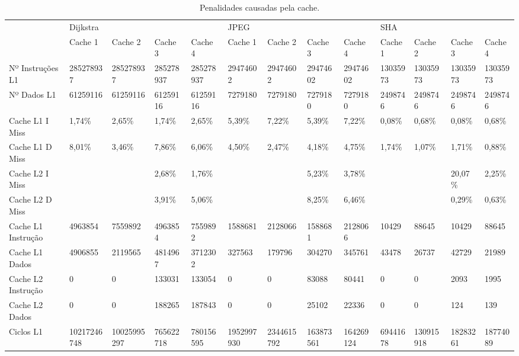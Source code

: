 \documentclass[pdftex,12pt,a4paper]{article}
\begin{document}
\begin{table}[h]
\resizebox{17cm}{!} {
\begin{tabular}{l|llll|llll|llll|}
                   & Dijkstra    &             &            &            & JPEG       &            &           &           & SHA       &           &           &           \\
                   & Cache 1     & Cache 2     & Cache 3    & Cache 4    & Cache 1    & Cache 2    & Cache 3   & Cache 4   & Cache 1   & Cache 2   & Cache 3   & Cache 4   \\ \hline
Nº Instruções L1   & 285278937   & 285278937   & 285278937  & 285278937  & 29474602   & 29474602   & 29474602  & 29474602  & 13035973  & 13035973  & 13035973  & 13035973  \\
Nº Dados L1        & 61259116    & 61259116    & 61259116   & 61259116   & 7279180    & 7279180    & 7279180   & 7279180   & 2498746   & 2498746   & 2498746   & 2498746   \\ \hline
Cache L1 I Miss    & 1,74\%      & 2,65\%      & 1,74\%     & 2,65\%     & 5,39\%     & 7,22\%     & 5,39\%    & 7,22\%    & 0,08\%    & 0,68\%    & 0,08\%    & 0,68\%    \\
Cache L1 D Miss    & 8,01\%      & 3,46\%      & 7,86\%     & 6,06\%     & 4,50\%     & 2,47\%     & 4,18\%    & 4,75\%    & 1,74\%    & 1,07\%    & 1,71\%    & 0,88\%    \\
Cache L2 I Miss    &             &             & 2,68\%     & 1,76\%     &            &            & 5,23\%    & 3,78\%    &           &           & 20,07\%   & 2,25\%    \\
Cache L2 D Miss    &             &             & 3,91\%     & 5,06\%     &            &            & 8,25\%    & 6,46\%    &           &           & 0,29\%    & 0,63\%    \\ \hline
Cache L1 Instrução & 4963854     & 7559892     & 4963854    & 7559892    & 1588681    & 2128066    & 1588681   & 2128066   & 10429     & 88645     & 10429     & 88645     \\
Cache L1 Dados     & 4906855     & 2119565     & 4814967    & 3712302    & 327563     & 179796     & 304270    & 345761    & 43478     & 26737     & 42729     & 21989     \\
Cache L2 Instrução & 0           & 0           & 133031     & 133054     & 0          & 0          & 83088     & 80441     & 0         & 0         & 2093      & 1995      \\
Cache L2 Dados     & 0           & 0           & 188265     & 187843     & 0          & 0          & 25102     & 22336     & 0         & 0         & 124       & 139       \\ \hline
Ciclos L1          & 10217246748 & 10025995297 & 765622718  & 780156595  & 1952997930 & 2344615792 & 163873561 & 164269124 & 69441678  & 130915918 & 18283261  & 18774089  \\ \hline
\end{tabular}
}
\caption{Penalidades causadas pela cache.}
\label{tab2}
\end{table}
\end{document}
